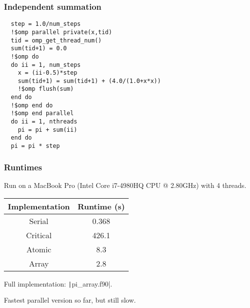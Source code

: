 \documentclass{beamer}
\begin{document}
\begin{frame}[fragile]
\frametitle{Independent summation}
\begin{verbatim}
  step = 1.0/num_steps
  !$omp parallel private(x,tid)
  tid = omp_get_thread_num()
  sum(tid+1) = 0.0
  !$omp do
  do ii = 1, num_steps
    x = (ii-0.5)*step
    sum(tid+1) = sum(tid+1) + (4.0/(1.0+x*x))
    !$omp flush(sum)
  end do
  !$omp end do
  !$omp end parallel
  do ii = 1, nthreads
    pi = pi + sum(ii)
  end do
  pi = pi * step
\end{verbatim}
\end{frame}

\begin{frame}
\frametitle{Runtimes}
Run on a MacBook Pro (Intel Core i7-4980HQ CPU @ 2.80GHz) with 4 threads.

\vfill

\begin{table}
\begin{tabular}{cc}
\toprule
Implementation & Runtime (s) \\
\midrule
Serial   & 0.368 \\
Critical & 426.1 \\
Atomic   & 8.3 \\
Array    & 2.8 \\
\bottomrule
\end{tabular}
\end{table}

Full implementation: \texttt|pi_array.f90|.

\begin{center}
\large Fastest parallel version so far, but still slow.
\end{center}

\end{frame}

\end{document}
